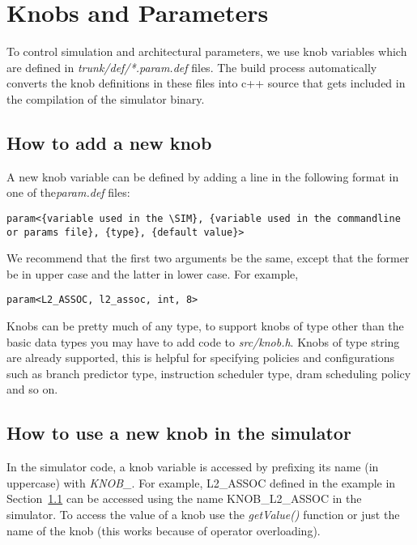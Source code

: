 

\chapter{Knobs and Parameters}
\label{sec:knob}

To control simulation and architectural parameters, we use knob variables which
are defined in \textit{trunk/def/*.param.def} files. The build process automatically 
converts the knob definitions in these files into c++ source that gets included in 
the compilation of the simulator binary.

\section{How to add a new knob}
\label{sec:knob1}

A new knob variable can be defined by adding a line in the following format in 
one of the\textit{param.def} files:

\begin{Verbatim}
param<{variable used in the \SIM}, {variable used in the commandline or params file}, {type}, {default value}>
\end{Verbatim}

We recommend that the first two arguments be the same, except that the former
be in upper case and the latter in lower case. For example,

\begin{Verbatim}
param<L2_ASSOC, l2_assoc, int, 8>
\end{Verbatim}



Knobs can be pretty much of any type, to support knobs of type other than the
basic data types you may have to add code to \textit{src/knob.h}. Knobs of type
string are already supported, this is helpful for specifying policies and
configurations such as branch predictor type, instruction scheduler type, dram
scheduling policy and so on. 


\section{How to use a new knob in the simulator}

In the simulator code, a knob variable is accessed by prefixing its name (in
uppercase) with \textit{KNOB\_}.  For example, L2\_ASSOC defined in the example
in Section~\ref{sec:knob1} can be accessed using the name KNOB\_L2\_ASSOC in
the simulator. To access the value of a knob use the \textit{getValue()}
function or just the name of the knob (this works because of operator
overloading).

